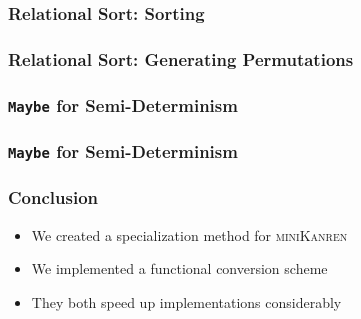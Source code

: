 \documentclass[xcolor={dvipsnames}, aspectratio=169]{beamer}
\newcommand{\mk}{\textsc{miniKanren}\xspace}
\begin{document}
\begin{frame}[fragile]
  \frametitle{Relational Sort: Sorting}
    
\end{frame}


\begin{frame}[fragile]
  \frametitle{Relational Sort: Generating Permutations}
    
\end{frame}


\begin{frame}[fragile]
  \frametitle{\lstinline[basicstyle=\Large]{Maybe} for Semi-Determinism}
\begin{center}
  \begin{minipage}{0.5\textwidth}
    
  \end{minipage}
\end{center}
\end{frame}

\begin{frame}[noframenumbering]
  \frametitle{\lstinline[basicstyle=\Large]{Maybe} for Semi-Determinism}
  \begin{center}
  \begin{minipage}{0.5\textwidth}
    
  \end{minipage}
\end{center}
\end{frame}


\begin{frame}[fragile]
  \frametitle{Conclusion}

\begin{itemize}
  \item We created a specialization method for \mk
  \item We implemented a functional conversion scheme
  \item They both speed up implementations considerably
\end{itemize}
\end{frame}
\end{document}
